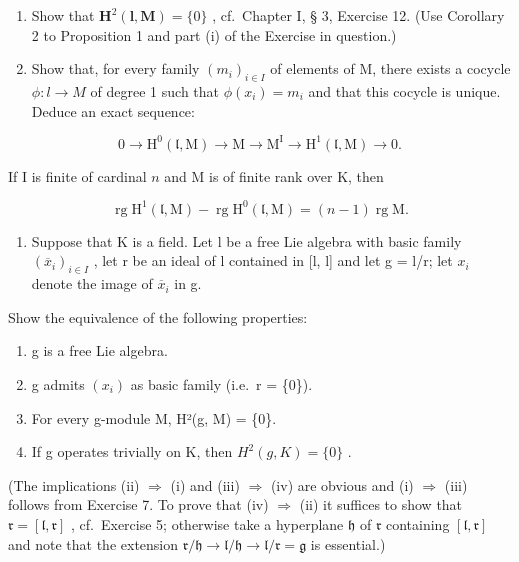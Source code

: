 \begin{enumerate}
\def\labelenumi{(\alph{enumi})}
\item
  Show that \(\mathbf{H}^2 (\mathbf{l},\mathbf{M}) = \{0\}\) , cf.~Chapter I, § 3, Exercise 12. (Use Corollary 2 to Proposition 1 and part (i) of the Exercise in question.)
\item
  Show that, for every family \((m_{i})_{i\in I}\) of elements of M, there exists a cocycle \(\phi:l\to M\) of degree 1 such that \(\phi (x_i) = m_i\) and that this cocycle is unique. Deduce an exact sequence:
\end{enumerate}

\[
0 \rightarrow \mathrm{H} ^ {0} (\mathfrak {l}, \mathrm{M}) \rightarrow \mathrm{M} \rightarrow \mathrm{M} ^ {\mathrm{I}} \rightarrow \mathrm{H} ^ {1} (\mathfrak {l}, \mathrm{M}) \rightarrow 0.
\]

If I is finite of cardinal \(n\) and M is of finite rank over K, then

\[
\operatorname{rg} \mathrm{H} ^ {1} (\mathfrak {l}, \mathrm{M}) - \operatorname{rg} \mathrm{H} ^ {0} (\mathfrak {l}, \mathrm{M}) = (n - 1) \operatorname{rg} \mathrm{M}.
\]

\begin{enumerate}
\def\labelenumi{\arabic{enumi}.}
\setcounter{enumi}{7}
\tightlist
\item
  Suppose that K is a field. Let l be a free Lie algebra with basic family \((\overline{x}_{i})_{i\in I}\) , let r be an ideal of l contained in {[}l, l{]} and let g = l/r; let \(x_{i}\) denote the image of \(\overline{x}_{i}\) in g.
\end{enumerate}

Show the equivalence of the following properties:

\begin{enumerate}
\def\labelenumi{(\roman{enumi})}
\item
  g is a free Lie algebra.
\item
  g admits \((x_{i})\) as basic family (i.e.~r = \{0\}).
\item
  For every g-module M, H²(g, M) = \{0\}.
\item
  If g operates trivially on K, then \(H^{2}(g, K) = \{0\}\) .
\end{enumerate}

(The implications (ii) \(\Rightarrow\) (i) and (iii) \(\Rightarrow\) (iv) are obvious and (i) \(\Rightarrow\) (iii) follows from Exercise 7. To prove that (iv) \(\Rightarrow\) (ii) it suffices to show that \(\mathfrak{r} = [\mathfrak{l},\mathfrak{r}]\) , cf.~Exercise 5; otherwise take a hyperplane \(\mathfrak{h}\) of \(\mathfrak{r}\) containing \([\mathfrak{l},\mathfrak{r}]\) and note that the extension \(\mathfrak{r} / \mathfrak{h}\to \mathfrak{l} / \mathfrak{h}\to \mathfrak{l} / \mathfrak{r} = \mathfrak{g}\) is essential.)

